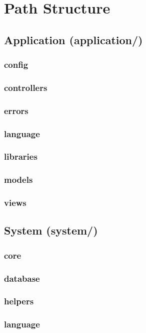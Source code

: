 \documentclass[11pt]{article} %
\begin{document}
\section{Path Structure}
\subsection{Application (application/)}
\subsubsection*{config}
\subsubsection*{controllers}
\subsubsection*{errors}
\subsubsection*{language}
\subsubsection*{libraries}
\subsubsection*{models}
\subsubsection*{views}
\subsection{System (system/)}
\subsubsection*{core}
\subsubsection*{database}
\subsubsection*{helpers}
\subsubsection*{language}
\end{document}
